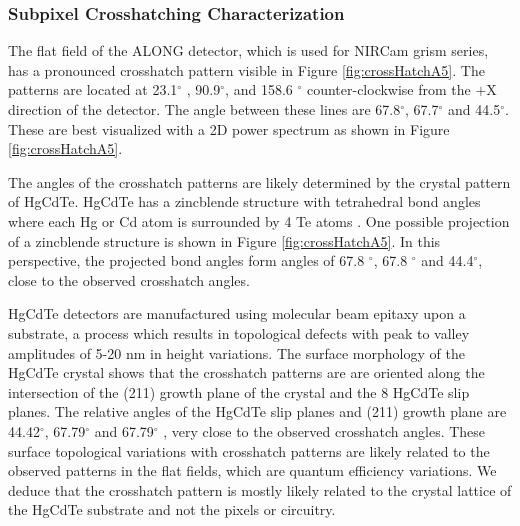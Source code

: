 \documentclass{aastex62}
\newcommand{\degree}{^\circ}
\begin{document}
\subsubsection{Subpixel Crosshatching Characterization}
The flat field of the ALONG detector, which is used for NIRCam grism series, has a pronounced crosshatch pattern visible in Figure \ref{fig:crossHatchA5}.
The patterns are located at 23.1$\degree$ , 90.9$\degree$, and 158.6 $\degree$ counter-clockwise from the $+$X direction of the detector.
The angle between these lines are 67.8$\degree$, 67.7$\degree$ and 44.5$\degree$.
These are best visualized with a 2D power spectrum as shown in Figure \ref{fig:crossHatchA5}.

The angles of the crosshatch patterns are likely determined by the crystal pattern of HgCdTe.
HgCdTe has a zincblende structure with tetrahedral bond angles where each Hg or Cd atom is surrounded by 4 Te atoms \citep{gemain2012mercVacanciesHgCdTe}.
One possible projection of a zincblende structure is shown in Figure \ref{fig:crossHatchA5}.
In this perspective, the projected bond angles form angles of 67.8 $\degree$, 67.8 $\degree$ and 44.4$\degree$, close to the observed crosshatch angles.

HgCdTe detectors are manufactured using molecular beam epitaxy upon a substrate, a process which results in topological defects with peak to valley amplitudes of 5-20 nm in height variations.
The surface morphology of the HgCdTe crystal shows that the crosshatch patterns are are oriented along the intersection of the (211) growth plane of the crystal and the 8 HgCdTe slip planes.
The relative angles of the HgCdTe slip planes and (211) growth plane are 44.42$\degree$, 67.79$\degree$ and 67.79$\degree$ \citep{chang2008surfaceMorphologyHgCdTe}, very close to the observed crosshatch angles.
These surface topological variations with crosshatch patterns are likely related to the observed patterns in the flat fields, which are quantum efficiency variations.
We deduce that the crosshatch pattern is mostly likely related to the crystal lattice of the HgCdTe substrate and not the pixels or circuitry.
\end{document}
